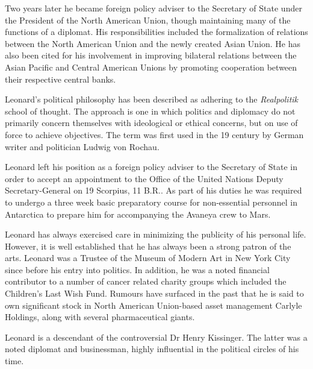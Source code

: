 Two years later he became foreign policy adviser to the Secretary of State under the President of the North American Union, though maintaining many of the functions of a diplomat. His responsibilities included the formalization of relations between the North American Union and the newly created Asian Union. He has also been cited for his involvement in improving bilateral relations between the Asian Pacific and Central American Unions by promoting cooperation between their respective central banks. 

Leonard's political philosophy has been described as adhering to the {\it Realpolitik} school of thought. The approach is one in which politics and diplomacy do not primarily concern themselves with ideological or ethical concerns, but on use of force to achieve objectives. The term was first used in the 19 century by German writer and politician Ludwig von Rochau.

Leonard left his position as a foreign policy adviser to the Secretary of State in order to accept an appointment to the Office of the United Nations Deputy Secretary-General on 19 Scorpius, 11 B.R.. As part of his duties he was required to undergo a three week basic preparatory course for non-essential personnel in Antarctica to prepare him for accompanying the Avaneya crew to Mars.

Leonard has always exercised care in minimizing the publicity of his personal life. However, it is well established that he has always been a strong patron of the arts. Leonard was a Trustee of the Museum of Modern Art in New York City since before his entry into politics. In addition, he was a noted financial contributor to a number of cancer related charity groups which included the Children's Last Wish Fund. Rumours have surfaced in the past that he is said to own significant stock in North American Union-based asset management Carlyle Holdings, along with several pharmaceutical giants.

Leonard is a descendant of the controversial Dr Henry Kissinger. The latter was a noted diplomat and businessman, highly influential in the political circles of his time.

